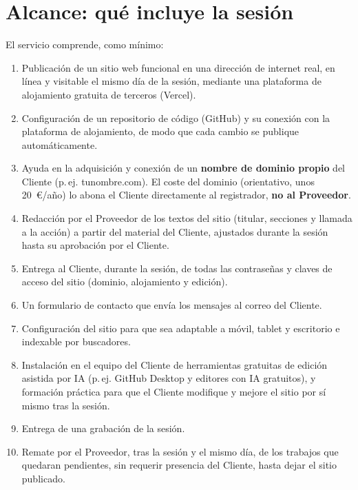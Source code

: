 \documentclass[11pt,a4paper]{article}
\begin{document}
\section{Alcance: qué incluye la sesión}

El servicio comprende, como mínimo:
\begin{enumerate}[label=\alph*)]
  \item Publicación de un sitio web funcional en una dirección de internet real,
        en línea y visitable el mismo día de la sesión, mediante una plataforma de
        alojamiento gratuita de terceros (Vercel).
  \item Configuración de un repositorio de código (GitHub) y su conexión con la
        plataforma de alojamiento, de modo que cada cambio se publique
        automáticamente.
  \item Ayuda en la adquisición y conexión de un \textbf{nombre de dominio propio}
        del Cliente (p.\,ej. tunombre.com). El coste del dominio (orientativo, unos
        20~\euro/año) lo abona el Cliente directamente al registrador, \textbf{no al
        Proveedor}.
  \item Redacción por el Proveedor de los textos del sitio (titular, secciones y
        llamada a la acción) a partir del material del Cliente, ajustados durante
        la sesión hasta su aprobación por el Cliente.
  \item Entrega al Cliente, durante la sesión, de todas las contraseñas y claves
        de acceso del sitio (dominio, alojamiento y edición).
  \item Un formulario de contacto que envía los mensajes al correo del Cliente.
  \item Configuración del sitio para que sea adaptable a móvil, tablet y escritorio
        e indexable por buscadores.
  \item Instalación en el equipo del Cliente de herramientas gratuitas de edición
        asistida por IA (p.\,ej. GitHub Desktop y editores con IA gratuitos), y
        formación práctica para que el Cliente modifique y mejore el sitio por sí
        mismo tras la sesión.
  \item Entrega de una grabación de la sesión.
  \item Remate por el Proveedor, tras la sesión y el mismo día, de los trabajos
        que quedaran pendientes, sin requerir presencia del Cliente, hasta dejar
        el sitio publicado.
\end{enumerate}

\end{document}
